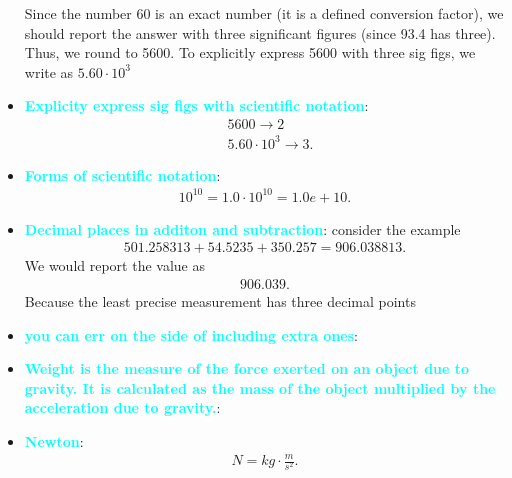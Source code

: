 \documentclass{report}
\begin{document}
\begin{itemize}
            Since the number 60 is an exact number (it is a defined conversion factor), we should report the answer with three significant figures (since 93.4 has three). Thus, we round to 5600. To explicitly express 5600 with three sig figs, we write as $5.60 \cdot 10^{3} $
        \item \textbf{\textcolor{cyan}{Explicity express sig figs with scientific notation}}:
            \begin{align*}
                &5600 \rightarrow 2 \\
                &5.60 \cdot 10^{3} \rightarrow 3
            .\end{align*}
        \item \textbf{\textcolor{cyan}{Forms of scientific notation}}: 
            \begin{align*}
                10^{10} = 1.0 \cdot 10^{10} = 1.0e+10
            .\end{align*}
        \item \textbf{\textcolor{cyan}{Decimal places in additon and subtraction}}: consider the example
            \begin{align*}
                501.258313 + 54.5235 + 350.257 = 906.038813
            .\end{align*}
            We would report the value as 
            \begin{align*}
                906.039
            .\end{align*}
            Because the least precise measurement has three decimal points
        \item \textbf{\textcolor{cyan}{you can err on the side of including extra ones}}:
        \item \textbf{\textcolor{cyan}{Weight is the measure of the force exerted on an object due to gravity. It is calculated as the mass of the object multiplied by the acceleration due to gravity.}}:
        \item \textbf{\textcolor{cyan}{Newton}}:
            \begin{align*}
                N = kg \cdot \frac{m}{s^{2}}
            .\end{align*}
    \end{itemize}

    \pagebreak 
\end{document}
